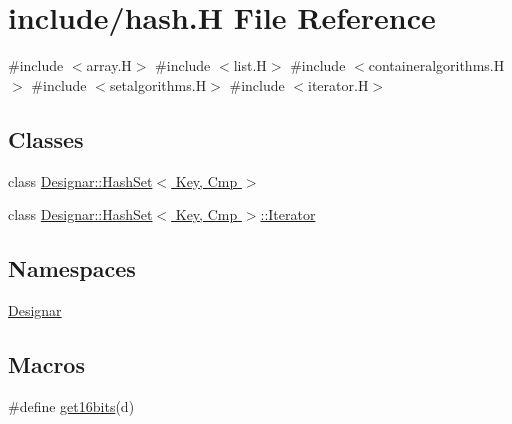 \hypertarget{hash_8_h}{}\section{include/hash.H File Reference}
\label{hash_8_h}
{\ttfamily \#include $<$array.\+H$>$}\newline
{\ttfamily \#include $<$list.\+H$>$}\newline
{\ttfamily \#include $<$containeralgorithms.\+H$>$}\newline
{\ttfamily \#include $<$setalgorithms.\+H$>$}\newline
{\ttfamily \#include $<$iterator.\+H$>$}\newline
\subsection*{Classes}
\begin{DoxyCompactItemize}
\item 
class \hyperlink{class_designar_1_1_hash_set}{Designar\+::\+Hash\+Set$<$ Key, Cmp $>$}
\item 
class \hyperlink{class_designar_1_1_hash_set_1_1_iterator}{Designar\+::\+Hash\+Set$<$ Key, Cmp $>$\+::\+Iterator}
\end{DoxyCompactItemize}
\subsection*{Namespaces}
\begin{DoxyCompactItemize}
\item 
 \hyperlink{namespace_designar}{Designar}
\end{DoxyCompactItemize}
\subsection*{Macros}
\begin{DoxyCompactItemize}
\item 
\#define \hyperlink{hash_8_h_abc7d71657be8975a51684e41029b7964}{get16bits}(d)
\end{DoxyCompactItemize}
